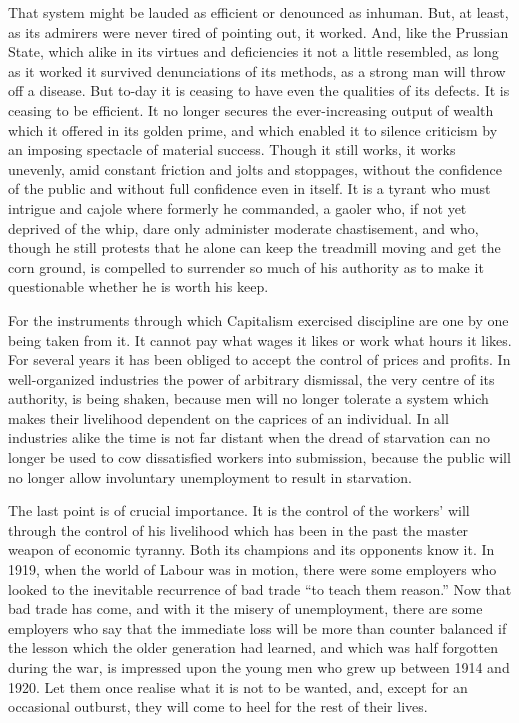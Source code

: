 \documentclass{book}
\begin{document}
That system might be lauded as efficient or denounced as inhuman. But, at least, as its admirers were never tired of pointing out, it worked. And, like the Prussian State, which alike in its virtues and deficiencies it not a little resembled, as long as it worked it survived denunciations of its methods, as a strong man will throw off a disease. But to-day it is ceasing to have even the qualities of its defects. It is ceasing to be efficient. It no longer secures the ever-increasing output of wealth which it offered in its golden prime, and which enabled it to silence criticism by an imposing spectacle of material success. Though it still works, it works unevenly, amid constant friction and jolts and stoppages, without the confidence of the public and without full confidence even in itself. It is a tyrant who must intrigue and cajole where formerly he commanded, a gaoler who, if not yet deprived of the whip, dare only administer moderate chastisement, and who, though he still protests that he alone can keep the treadmill moving and get the corn ground, is compelled to surrender so much of his authority as to make it questionable whether he is worth his keep.

For the instruments through which Capitalism exercised discipline are one by one being taken from it. It cannot pay what wages it likes or work what hours it likes. For several years it has been obliged to accept the control of prices and profits. In well-organized industries the power of arbitrary dismissal, the very centre of its authority, is being shaken, because men will no longer tolerate a system which makes their livelihood dependent on the caprices of an individual. In all industries alike the time is not far distant when the dread of starvation can no longer be used to cow dissatisfied workers into submission, because the public will no longer allow involuntary unemployment to result in starvation.

The last point is of crucial importance. It is the control of the workers’ will through the control of his livelihood which has been in the past the master weapon of economic tyranny. Both its champions and its opponents know it. In 1919, when the world of Labour was in motion, there were some employers who looked to the inevitable recurrence of bad trade “to teach them reason.” Now that bad trade has come, and with it the misery of unemployment, there are some employers who say that the immediate loss will be more than counter balanced if the lesson which the older generation had learned, and which was half forgotten during the war, is impressed upon the young men who grew up between 1914 and 1920. Let them once realise what it is not to be wanted, and, except for an occasional outburst, they will come to heel for the rest of their lives.
\end{document}

